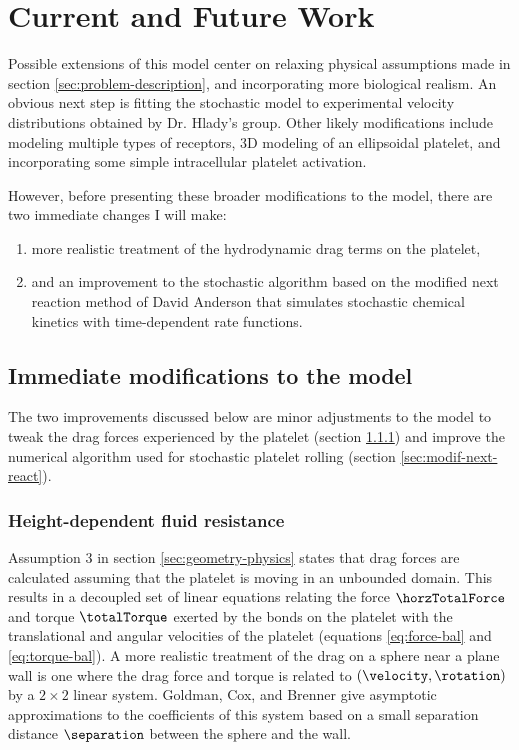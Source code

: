 
\chapter{Current and Future Work}
\label{cha:future-work}

Possible extensions of this model center on relaxing physical
assumptions made in section \ref{sec:problem-description}, and
incorporating more biological realism. An obvious next step is fitting
the stochastic model to experimental velocity distributions obtained
by Dr. Hlady's group. Other likely modifications include modeling
multiple types of receptors, 3D modeling of an ellipsoidal platelet,
and incorporating some simple intracellular platelet activation.

However, before presenting these broader modifications to the model,
there are two immediate changes I will make:
\begin{enumerate}
\item more realistic treatment of the hydrodynamic drag terms on the
  platelet,
\item and an improvement to the stochastic algorithm based on the
  modified next reaction method of David Anderson \cite{Anderson2007}
  that simulates stochastic chemical kinetics with time-dependent rate
  functions. 
\end{enumerate}

\section{Immediate modifications to the model}
\label{sec:immed-modif-model}

The two improvements discussed below are minor adjustments to the
model to tweak the drag forces experienced by the platelet (section
\ref{sec:height-depend-fluid}) and improve the numerical algorithm
used for stochastic platelet rolling (section
\ref{sec:modif-next-react}).

\subsection{Height-dependent fluid resistance}
\label{sec:height-depend-fluid}

Assumption 3 in section \ref{sec:geometry-physics} states that drag
forces are calculated assuming that the platelet is moving in an
unbounded domain. This results in a decoupled set of linear equations
relating the force $\horzTotalForce$ and torque $\totalTorque$ exerted
by the bonds on the platelet with the translational and angular
velocities of the platelet (equations \eqref{eq:force-bal} and
\eqref{eq:torque-bal}). A more realistic treatment of the drag on a
sphere near a plane wall is one where the drag force and torque is
related to $(\velocity, \rotation)$ by a $2 \times 2$ linear
system. Goldman, Cox, and Brenner \cite{Goldman1967a} give asymptotic
approximations to the coefficients of this system based on a small
separation distance $\separation$ between the sphere and the wall.

